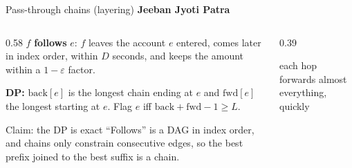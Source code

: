 \documentclass[aspectratio=169,11pt]{beamer}
\newcommand{\memberbadge}[1]{%
  \hfill{\small\bfseries\color{memberred}#1}%
}
\begin{document}
\begin{frame}{Pass-through chains (layering) \memberbadge{Jeeban Jyoti Patra}}
\begin{columns}[T,onlytextwidth]
\begin{column}{0.58\textwidth}
$f$ \textbf{follows} $e$: $f$ leaves the account $e$ entered, comes later in index order, within $D$ seconds, and keeps the amount within a $1 - \varepsilon$ factor.

\vspace{0.25cm}
\textbf{DP:} $\text{back}[e]$ is the longest chain ending at $e$ and $\text{fwd}[e]$ the longest starting at $e$. Flag $e$ iff $\text{back} + \text{fwd} - 1 \ge L$.

\vspace{0.3cm}
\begin{block}{Claim: the DP is exact}
``Follows'' is a DAG in index order, and chains only constrain consecutive edges, so the best prefix joined to the best suffix is a chain.
\end{block}
\end{column}
\begin{column}{0.39\textwidth}
\centering
\vspace{1.2cm}

\vspace{0.35cm}
{\footnotesize each hop forwards almost everything, quickly}
\end{column}
\end{columns}
\end{frame}
\end{document}
